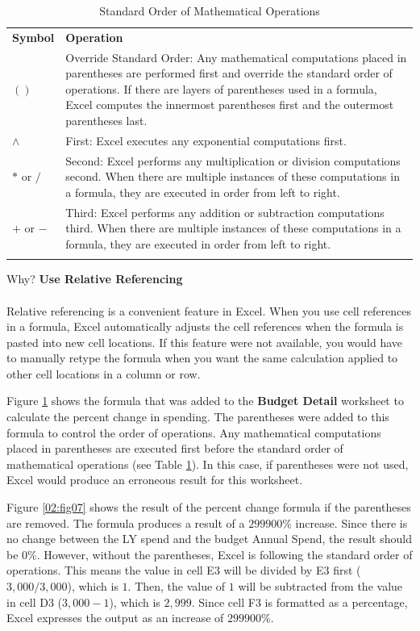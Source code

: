 \begin{longtable}{p{0.85in}p{2.8in}}
	\textbf{Symbol} & \textbf{Operation} \endhead
	\hline \\
	$ () $ & Override Standard Order: Any mathematical computations placed in parentheses are performed first and override the standard order of operations. If there are layers of parentheses used in a formula, Excel computes the innermost parentheses first and the outermost parentheses last.\\
	$ \wedge $ & First: Excel executes any exponential computations first.\\
	$ * $ or $ / $ & Second: Excel performs any multiplication or division computations second. When there are multiple instances of these 	computations in a formula, they are executed in order from left to right.\\
	$ + $ or $ - $ & Third: Excel performs any addition or subtraction computations third. When there are multiple instances of these 	computations in a formula, they are executed in order from left to right.\\
	\hline
	\caption{Standard Order of Mathematical Operations}
	\label{02:tab03}
\end{longtable}

\begin{center}
	\begin{infobox}{Why?}
		\textbf{Use Relative Referencing}
		\\
		\\
		Relative referencing is a convenient feature in Excel. When you use cell references in a formula, Excel automatically adjusts the cell references when the formula is pasted into new cell locations. If this feature were not available, you would have to manually retype the formula when you want the same calculation applied to other cell locations in a 		column or row.
	\end{infobox}
\end{center}

Figure \ref{02:tab03} shows the formula that was added to the \textbf{Budget Detail} worksheet to calculate the percent change in spending. The parentheses were added to this formula to control the order of operations. Any mathematical computations placed in parentheses are executed first before the standard order of mathematical operations (see Table \ref{02:tab03}). In this case, if parentheses were not used, Excel would produce an erroneous result for this worksheet.

Figure \ref{02:fig07} shows the result of the percent change formula if the parentheses are removed. The formula produces a result of a $ 299900\% $ increase. Since there is no change between the LY spend and the budget Annual Spend, the result should be 0\%. However, without the parentheses, Excel is following the standard order of operations. This means the value in cell \textsf{E3} will be divided by \textsf{E3} first ($ 3,000 / 3,000 $), which is $ 1 $. Then, the value of $ 1 $ will be subtracted from the value in cell \textsf{D3} ($ 3,000 - 1 $), which is $ 2,999 $. Since cell \textsf{F3} is formatted as a percentage, Excel expresses the output as an increase of $ 299900\% $.

